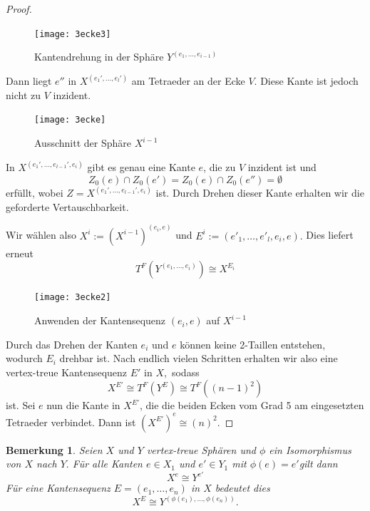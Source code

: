 \documentclass[12pt,titlepage,twoside,cleardoublepage]{article}
\theoremstyle{nummermitklammern}
\newtheorem{bemerkung}[temp]{Bemerkung}
\newtheorem{bemerkung}[zahl]{Bemerkung}
\numberwithin{equation}{section}
\begin{document}
\begin{proof}
\begin{itemize}
\begin{figure}[H]
\begin{center}
\texttt{[image: 3ecke3]}
\end{center}
\caption{Kantendrehung in der Sphäre $Y^{(e_1,\ldots,e_{i-1})}$}
\end{figure}
Dann liegt $e''$ in $X^{(e_1',\ldots,e_l')}$ am Tetraeder an der Ecke $V.$ Diese Kante ist jedoch nicht zu $V$ inzident.  
\begin{figure}[H]
\begin{center}
\texttt{[image: 3ecke]}
\end{center}
\caption{Ausschnitt der Sphäre $X^{i-1}$}
\end{figure}
In $X^{(e_1',\ldots,e_{l-1}',e_i)}$ gibt es genau eine Kante $e$, die zu $V$ inzident ist und 
 \[
Z_0(e)\cap Z_0(e')=Z_0(e)\cap Z_0(e'')=\emptyset
\]
erfüllt, wobei $Z=X^{(e_1',\ldots,e_{l-1}',e_i)}$ ist. Durch Drehen dieser Kante erhalten wir die geforderte Vertauschbarkeit.

Wir wählen also $X^{i}:={(X^{i-1})}^{(e_i,e)}$ und $E^{i}:=(e'_1,\ldots,e'_l,e_i,e).$ Dies liefert erneut
\[
T^F(Y^{(e_1,\ldots,e_i)})\cong X^{E_{i}}
\] 
\begin{figure}[H]
\begin{center}
\texttt{[image: 3ecke2]}
\end{center}
\caption{Anwenden der Kantensequenz $(e_i,e)$ auf $X^{i-1}$}
\end{figure}
\end{itemize}
 Durch das Drehen der Kanten $e_i$ und $e$ können keine 2-Taillen entstehen, wodurch $E_{i}$ drehbar ist.
Nach endlich vielen Schritten erhalten wir also eine vertex-treue Kantensequenz $E'$ in $X,$ sodass 
\[X^{E'}\cong T^F(Y^E) \cong T^F((n-1)^2)
\]ist.
Sei $e$ nun die Kante in $X^{E'}$, die die beiden Ecken vom Grad 5 am eingesetzten Tetraeder verbindet. Dann ist $(X^{E'})^e\cong (n)^2.$
\end{proof}
\begin{bemerkung}
Seien $X$ und $Y$ vertex-treue Sphären und $\phi$ ein Isomorphismus von $X$ nach $Y.$ Für alle Kanten $e\in X_1$ und $e'\in Y_1$ mit $\phi(e)=e'$gilt dann
\[ 
X^e \cong Y^{e'} 
\]
Für eine Kantensequenz $E=(e_1,\ldots,e_n)$ in $X$ bedeutet dies 
\[
X^E\cong Y^{(\phi(e_1),\ldots,\phi(e_n))}.
\]
\end{bemerkung}
\end{document}
